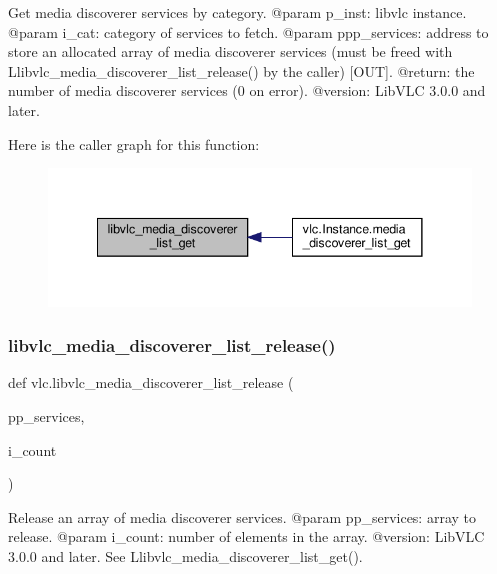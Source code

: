 \begin{DoxyVerb}Get media discoverer services by category.
@param p_inst: libvlc instance.
@param i_cat: category of services to fetch.
@param ppp_services: address to store an allocated array of media discoverer services (must be freed with L{libvlc_media_discoverer_list_release}() by the caller) [OUT].
@return: the number of media discoverer services (0 on error).
@version: LibVLC 3.0.0 and later.
\end{DoxyVerb}
 Here is the caller graph for this function\+:
\nopagebreak
\begin{figure}[H]
\begin{center}
\leavevmode
\includegraphics[width=341pt]{namespacevlc_ad4eb84abb29b0c9c742ce5444bb21d69_icgraph}
\end{center}
\end{figure}
\mbox{\label{namespacevlc_a0b232d83e1c5d5876f6438665a63532f}} 
\subsubsection{\texorpdfstring{libvlc\+\_\+media\+\_\+discoverer\+\_\+list\+\_\+release()}{libvlc\_media\_discoverer\_list\_release()}}
{\footnotesize\ttfamily def vlc.\+libvlc\+\_\+media\+\_\+discoverer\+\_\+list\+\_\+release (\begin{DoxyParamCaption}\item[{}]{pp\+\_\+services,  }\item[{}]{i\+\_\+count }\end{DoxyParamCaption})}

\begin{DoxyVerb}Release an array of media discoverer services.
@param pp_services: array to release.
@param i_count: number of elements in the array.
@version: LibVLC 3.0.0 and later. See L{libvlc_media_discoverer_list_get}().
\end{DoxyVerb}
 \mbox{\label{namespacevlc_a3b2a41bfb1a505c80af56dad8ce507ac}} 
